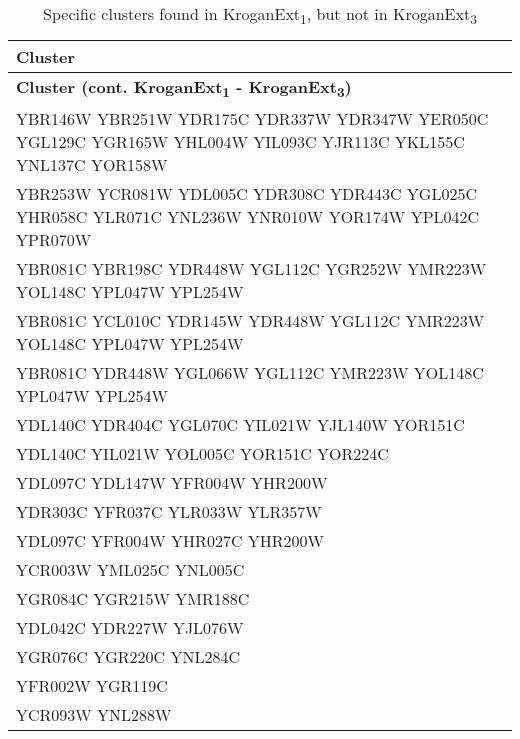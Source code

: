 \setlength{\extrarowheight}{2pt}
\renewcommand{\arraystretch}{1.2}
\begin{longtable}{| m{27em} |}
\caption{Specific clusters found in KroganExt\textsubscript{1}, but not in KroganExt\textsubscript{3}} \\
\hline
\textbf{Cluster} \\
\hline
\endfirsthead
\hline
\textbf{Cluster (cont. KroganExt\textsubscript{1} - KroganExt\textsubscript{3})} \\
\hline
\endhead
\hline
\endfoot
\hline
\endlastfoot
YBR146W YBR251W YDR175C YDR337W YDR347W YER050C YGL129C YGR165W YHL004W YIL093C YJR113C YKL155C YNL137C YOR158W \\
\hline
YBR253W YCR081W YDL005C YDR308C YDR443C YGL025C YHR058C YLR071C YNL236W YNR010W YOR174W YPL042C YPR070W \\
\hline
YBR081C YBR198C YDR448W YGL112C YGR252W YMR223W YOL148C YPL047W YPL254W \\
\hline
YBR081C YCL010C YDR145W YDR448W YGL112C YMR223W YOL148C YPL047W YPL254W \\
\hline
YBR081C YDR448W YGL066W YGL112C YMR223W YOL148C YPL047W YPL254W \\
\hline
YDL140C YDR404C YGL070C YIL021W YJL140W YOR151C \\
\hline
YDL140C YIL021W YOL005C YOR151C YOR224C \\
\hline
YDL097C YDL147W YFR004W YHR200W \\
\hline
YDR303C YFR037C YLR033W YLR357W \\
\hline
YDL097C YFR004W YHR027C YHR200W \\
\hline
YCR003W YML025C YNL005C \\
\hline
YGR084C YGR215W YMR188C \\
\hline
YDL042C YDR227W YJL076W \\
\hline
YGR076C YGR220C YNL284C \\
\hline
YFR002W YGR119C \\
\hline
YCR093W YNL288W \\
\hline
\end{longtable}